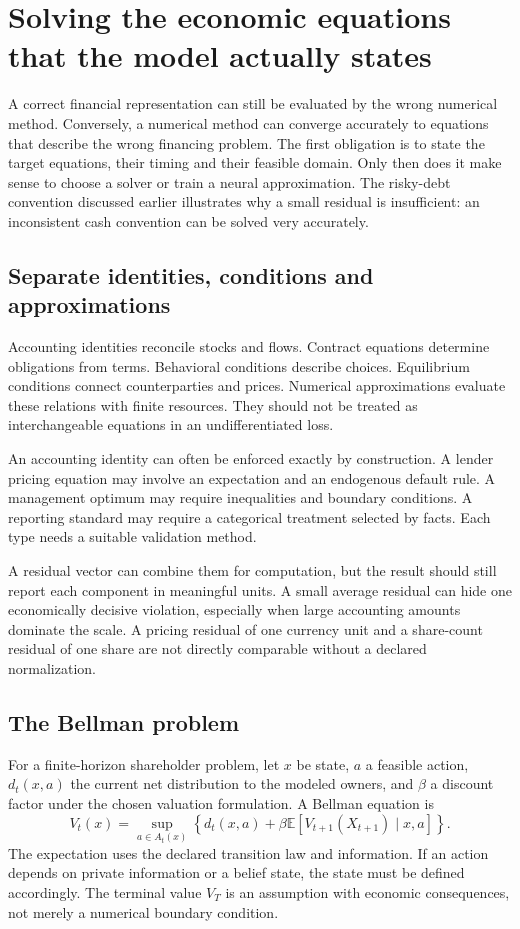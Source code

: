 \chapter[Solving the economic equations]{Solving the economic equations that the model actually states}
\label{sim:numerics}

A correct financial representation can still be evaluated by the wrong numerical method. Conversely, a numerical method can converge accurately to equations that describe the wrong financing problem. The first obligation is to state the target equations, their timing and their feasible domain. Only then does it make sense to choose a solver or train a neural approximation. The risky-debt convention discussed earlier illustrates why a small residual is insufficient: an inconsistent cash convention can be solved very accurately.

\section{Separate identities, conditions and approximations}
Accounting identities reconcile stocks and flows. Contract equations determine obligations from terms. Behavioral conditions describe choices. Equilibrium conditions connect counterparties and prices. Numerical approximations evaluate these relations with finite resources. They should not be treated as interchangeable equations in an undifferentiated loss.

An accounting identity can often be enforced exactly by construction. A lender pricing equation may involve an expectation and an endogenous default rule. A management optimum may require inequalities and boundary conditions. A reporting standard may require a categorical treatment selected by facts. Each type needs a suitable validation method.

A residual vector can combine them for computation, but the result should still report each component in meaningful units. A small average residual can hide one economically decisive violation, especially when large accounting amounts dominate the scale. A pricing residual of one currency unit and a share-count residual of one share are not directly comparable without a declared normalization.

\section{The Bellman problem}
For a finite-horizon shareholder problem, let $x$ be state, $a$ a feasible action, $d_t(x,a)$ the current net distribution to the modeled owners, and $\beta$ a discount factor under the chosen valuation formulation. A Bellman equation is
\begin{equation}
 V_t(x)=\sup_{a\in A_t(x)}\left\{d_t(x,a)+\beta\mathbb E[V_{t+1}(X_{t+1})\mid x,a]\right\}.
 \label{sim:bellman}
\end{equation}
The expectation uses the declared transition law and information. If an action depends on private information or a belief state, the state must be defined accordingly. The terminal value $V_T$ is an assumption with economic consequences, not merely a numerical boundary condition.

